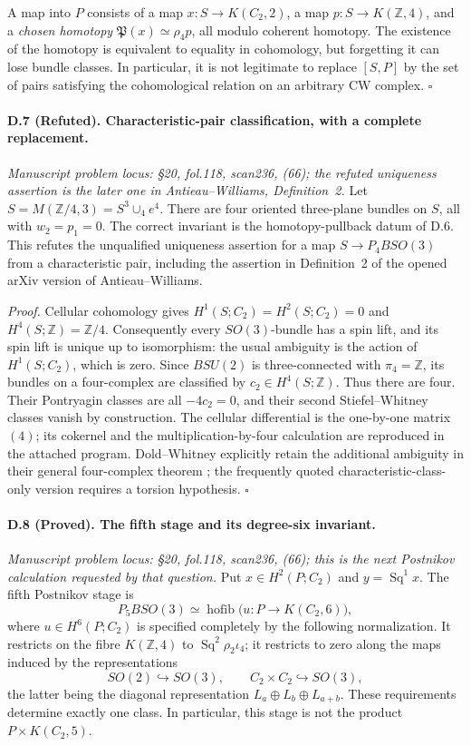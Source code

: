 A map into $P$ consists of a map $x:S\to K(C_2,2)$, a map $p:S\to K(\mathbb Z,4)$, and a \emph{chosen homotopy} $\mathfrak P(x)\simeq\rho_4p$, all modulo coherent homotopy. The existence of the homotopy is equivalent to equality in cohomology, but forgetting it can lose bundle classes. In particular, it is not legitimate to replace $[S,P]$ by the set of pairs satisfying the cohomological relation on an arbitrary CW complex. \hfill$\square$

\paragraph{D.7 (Refuted). Characteristic-pair classification, with a complete replacement.}
\emph{Manuscript problem locus: \S20, fol.118, scan236, (66); the refuted uniqueness assertion is the later one in Antieau--Williams, Definition~2.}
Let $S=M(\mathbb Z/4,3)=S^3\cup_4 e^4$. There are four oriented three-plane bundles on $S$, all with $w_2=p_1=0$. The correct invariant is the homotopy-pullback datum of D.6. This refutes the unqualified uniqueness assertion for a map $S\to P_4BSO(3)$ from a characteristic pair, including the assertion in Definition~2 of the opened arXiv version of Antieau--Williams.

\emph{Proof.} Cellular cohomology gives $H^1(S;C_2)=H^2(S;C_2)=0$ and $H^4(S;\mathbb Z)=\mathbb Z/4$. Consequently every $SO(3)$-bundle has a spin lift, and its spin lift is unique up to isomorphism: the usual ambiguity is the action of $H^1(S;C_2)$, which is zero. Since $BSU(2)$ is three-connected with $\pi_4=\mathbb Z$, its bundles on a four-complex are classified by $c_2\in H^4(S;\mathbb Z)$. Thus there are four. Their Pontryagin classes are all $-4c_2=0$, and their second Stiefel--Whitney classes vanish by construction. The cellular differential is the one-by-one matrix $(4)$; its cokernel and the multiplication-by-four calculation are reproduced in the attached program. Dold--Whitney explicitly retain the additional ambiguity in their general four-complex theorem \cite{DoldWhitney1959}; the frequently quoted characteristic-class-only version requires a torsion hypothesis. \hfill$\square$

\paragraph{D.8 (Proved). The fifth stage and its degree-six invariant.}
\emph{Manuscript problem locus: \S20, fol.118, scan236, (66); this is the next Postnikov calculation requested by that question.}
Put $x\in H^2(P;C_2)$ and $y=\operatorname{Sq}^1x$. The fifth Postnikov stage is
\[
P_5BSO(3)\simeq\operatorname{hofib}
 \bigl(u:P\longrightarrow K(C_2,6)\bigr),
\]
where $u\in H^6(P;C_2)$ is specified completely by the following normalization. It restricts on the fibre $K(\mathbb Z,4)$ to $\operatorname{Sq}^2\rho_2\iota_4$; it restricts to zero along the maps induced by the representations
\[
SO(2)\hookrightarrow SO(3),\qquad
C_2\times C_2\hookrightarrow SO(3),
\]
the latter being the diagonal representation $L_a\oplus L_b\oplus L_{a+b}$. These requirements determine exactly one class. In particular, this stage is not the product $P\times K(C_2,5)$.

